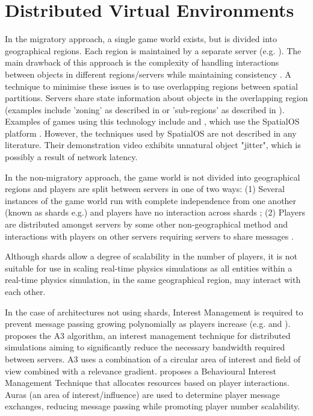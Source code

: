 \section{Distributed Virtual Environments}
 In the migratory approach, a single game world exists, but is divided into geographical regions. Each region is maintained by a separate server (e.g. \cite{AnOverlappingArchitecture, ScalabilityIssues, LoadBalancingForDistributedVR, ALoadBalancingAlgorithm, SpatialOS}). The main drawback of this approach is the complexity of handling interactions between objects in different regions/servers while maintaining consistency \cite{P2PForMMOs}. A technique to minimise these issues is to use overlapping regions between spatial partitions. Servers share state information about objects in the overlapping region (examples include 'zoning' as described in \cite{AnOverlappingArchitecture} or 'sub-regions' as described in \cite{ScalabilityIssues}). Examples of games using this technology include \cite{Vanishin30:online} and \cite{WorldsAd48:online}, which use the SpatialOS platform \cite{SpatialOS}. However, the techniques used by SpatialOS are not described in any literature. Their demonstration video exhibits unnatural object "jitter", which is possibly a result of network latency. 
 
In the non-migratory approach, the game world is not divided into geographical regions and players are split between servers in one of two ways: (1) Several instances of the game world run with complete independence from one another (known as shards e.g.\cite{WOW}) and players have no interaction across shards \cite{P2PForMMOs}; (2) Players are distributed amongst servers by some other non-geographical method and interactions with players on other servers requiring servers to share messages \cite{LoadBalancingforMMOs}.

Although shards allow a degree of scalability in the number of players, it is not suitable for use in scaling real-time physics simulations as all entities within a real-time physics simulation, in the same geographical region, may interact with each other.

In the case of architectures not using shards, Interest Management is required to prevent message passing growing polynomially as players increase (e.g. \cite{Bezerra2008} and \cite{LoadBalancingforMMOs}).
\cite{Bezerra2008} proposes the A3 algorithm, an interest management technique for distributed simulations aiming to significantly reduce the necessary bandwidth required between servers. A3 uses a combination of a circular area of interest and field of view combined with a relevance gradient. \cite{LoadBalancingforMMOs} proposes a Behavioural Interest Management Technique that allocates resources based on player interactions. Auras (an area of interest/influence) are used to determine player message exchanges, reducing message passing while promoting player number scalability.

